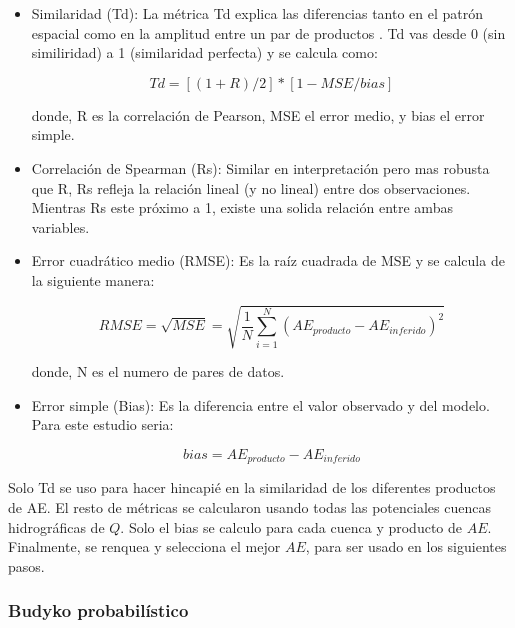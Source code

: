 \documentclass[12pt]{article}
\begin{document}
\begin{itemize}

	\item Similaridad (Td): La métrica Td explica las diferencias tanto en el patrón espacial como en la amplitud entre un par de productos \citep{Tian2017}. Td vas desde 0 (sin similiridad) a 1 (similaridad perfecta) y se calcula como:
	
	\begin{equation}
    Td = [(1 + R) / 2]*[1 - MSE/bias]
    \end{equation}
    
    donde, R es la correlación de Pearson, MSE el error medio, y bias el error simple.
    

	\item Correlación de Spearman (Rs): Similar en interpretación pero mas robusta que R, Rs refleja la relación lineal (y no lineal) entre dos observaciones. Mientras Rs este próximo a 1, existe una solida relación entre ambas variables.
	
	\item Error cuadrático medio (RMSE): Es la raíz cuadrada de MSE y se calcula de la siguiente manera:
	
    \begin{equation}
        RMSE = \sqrt{MSE} = \sqrt{\frac{1}{N} \sum_{i=1}^{N}(AE_{producto}-AE_{inferido})^{2}}
    \end{equation}
    
    donde, N es el numero de pares de datos.
    
	\item Error simple (Bias): Es la diferencia entre el valor observado y del modelo. Para este estudio seria:
	
    \begin{equation}
        bias = AE_{producto}-AE_{inferido}
    \end{equation}
	
\end{itemize}

Solo Td se uso para hacer hincapié en la similaridad de los diferentes productos de AE. El resto de métricas se calcularon usando todas las potenciales cuencas hidrográficas de $Q$. Solo el bias se calculo para cada cuenca y producto de $AE$. Finalmente, se renquea y selecciona el mejor $AE$, para ser usado en los siguientes pasos.

\subsubsection{Budyko probabilístico}
\end{document}
